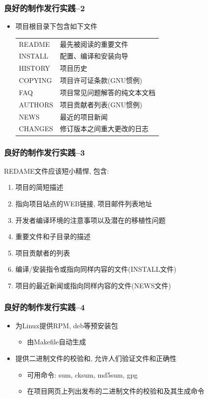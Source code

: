 \documentclass[compress]{beamer}
\begin{document}
\begin{frame}
\frametitle{良好的制作发行实践--2}
\begin{itemize}
  \item 项目根目录下包含如下文件\\
\begin{tabular}{p{3cm}l}
README & 最先被阅读的重要文件 \\
INSTALL & 配置、编译和安装向导 \\
HISTORY & 项目历史 \\
COPYING & 项目许可证条款(GNU惯例) \\
FAQ & 项目常见问题解答的纯文本文档 \\
AUTHORS & 项目贡献者列表(GNU惯例) \\
NEWS & 最近的项目新闻 \\
CHANGES & 修订版本之间重大更改的日志 \\

\end{tabular}
\end{itemize}


\end{frame}

\begin{frame}
\frametitle{良好的制作发行实践--3}
\noindent REDAME文件应该短小精悍, 包含:
{\small
  \begin{enumerate}
    \item 项目的简短描述
    \item 指向项目站点的WEB链接, 项目邮件列表地址
    \item 开发者编译环境的注意事项以及潜在的移植性问题
    \item 重要文件和子目录的描述
    \item 项目贡献者的列表
    \item 编译/安装指令或指向同样内容的文件(INSTALL文件)
    \item 项目的最近新闻或指向同样内容的文件(NEWS文件)
  \end{enumerate}
  }
	
  \end{frame}

\begin{frame}
\frametitle{良好的制作发行实践--4}
\begin{itemize}
\item 为Linux提供RPM, deb等预安装包
    \begin{itemize}
    \item 由Makefile自动生成
    \end{itemize}
\item 提供二进制文件的校验和, 允许人们验证文件和正确性
    \begin{itemize}
    \item 可用命令: \alert{sum}, \alert{cksum}, \alert{md5sum}, \alert{gpg}
    \item 在项目网页上列出发布的二进制文件的校验和及其生成命令
    \end{itemize}
\end{itemize}


\end{frame}
\end{document}
